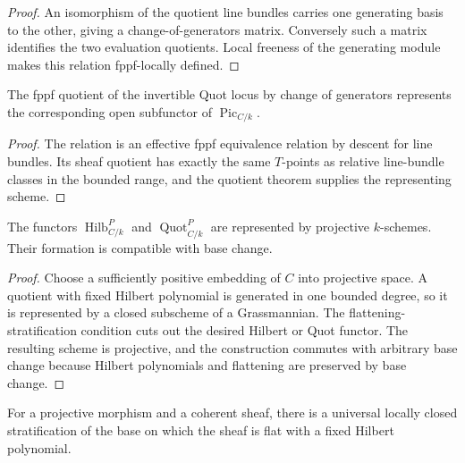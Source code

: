 \begin{proof}
  An isomorphism of the quotient line bundles carries one generating basis to
  the other, giving a change-of-generators matrix.  Conversely such a matrix
  identifies the two evaluation quotients.  Local freeness of the generating
  module makes this relation fppf-locally defined.
\end{proof}

\begin{proposition}
  \label{mk-prop-picard-quotient-descent}
  \cite{kleiman-picard}
  The fppf quotient of the invertible Quot locus by change of generators
  represents the corresponding open subfunctor of \(\operatorname{Pic}_{C/k}\).
\end{proposition}

\begin{proof}
  The relation is an effective fppf equivalence relation by descent for
  line bundles.  Its sheaf quotient has exactly the same \(T\)-points as
  relative line-bundle classes in the bounded range, and the quotient theorem
  supplies the representing scheme.
\end{proof}

\begin{theorem}
  \label{mk-thm-hilbert-quot}
  \cite{nitsure-hilbert-quot}
  The functors \(\operatorname{Hilb}^P_{C/k}\) and
  \(\operatorname{Quot}^P_{C/k}\) are represented by projective \(k\)-schemes.
  Their formation is compatible with base change.
\end{theorem}

\begin{proof}
  Choose a sufficiently positive embedding of \(C\) into projective space.
  A quotient with fixed Hilbert polynomial is generated in one bounded degree,
  so it is represented by a closed subscheme of a Grassmannian.  The
  flattening-stratification condition cuts out the desired Hilbert or Quot
  functor.  The resulting scheme is projective, and the construction commutes
  with arbitrary base change because Hilbert polynomials and flattening are
  preserved by base change.
\end{proof}

\begin{lemma}
  \label{mk-lem-flattening-stratification}
  \cite{nitsure-hilbert-quot}
  For a projective morphism and a coherent sheaf, there is a universal
  locally closed stratification of the base on which the sheaf is flat with a
  fixed Hilbert polynomial.
\end{lemma}

